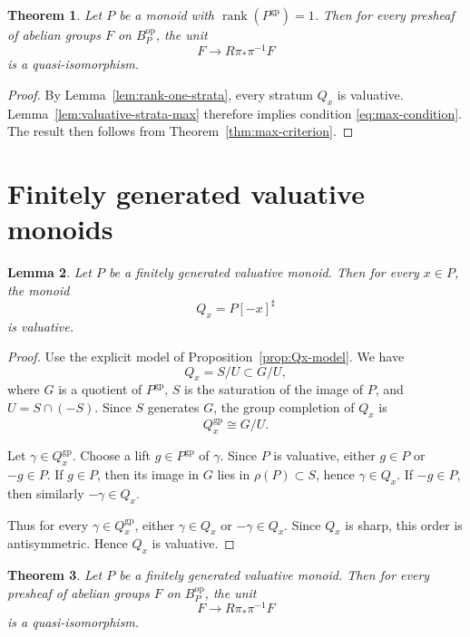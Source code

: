 \documentclass[12pt]{article}
\newtheorem{theorem}{Theorem}[section]
\newtheorem{lemma}[theorem]{Lemma}
\theoremstyle{definition}
\theoremstyle{remark}
\numberwithin{equation}{section}
\newcommand{\gp}{\mathrm{gp}}
\newcommand{\op}{\mathrm{op}}
\begin{document}
\begin{theorem}\label{thm:rank-one-yes}
Let \(P\) be a monoid with \(\operatorname{rank}(P^{\gp})=1\).  Then for every presheaf of abelian groups \(F\) on \(B_P^{\op}\), the unit
\[
F\longrightarrow R\pi_*\pi^{-1}F
\]
is a quasi-isomorphism.
\end{theorem}

\begin{proof}
By Lemma~\ref{lem:rank-one-strata}, every stratum \(Q_x\) is valuative.  Lemma~\ref{lem:valuative-strata-max} therefore implies condition \eqref{eq:max-condition}.  The result then follows from Theorem~\ref{thm:max-criterion}.
\end{proof}

\section{Finitely generated valuative monoids}

\begin{lemma}\label{lem:fg-valuative-strata}
Let \(P\) be a finitely generated valuative monoid.  Then for every \(x\in P\), the monoid
\[
Q_x=P[-x]^\sharp
\]
is valuative.
\end{lemma}

\begin{proof}
Use the explicit model of Proposition~\ref{prop:Qx-model}.  We have
\[
Q_x=S/U\subset G/U,
\]
where \(G\) is a quotient of \(P^{\gp}\), \(S\) is the saturation of the image of \(P\), and \(U=S\cap(-S)\).  Since \(S\) generates \(G\), the group completion of \(Q_x\) is
\[
Q_x^{\gp}\cong G/U.
\]

Let \(\gamma\in Q_x^{\gp}\).  Choose a lift \(g\in P^{\gp}\) of \(\gamma\).  Since \(P\) is valuative, either \(g\in P\) or \(-g\in P\).  If \(g\in P\), then its image in \(G\) lies in \(\rho(P)\subset S\), hence \(\gamma\in Q_x\).  If \(-g\in P\), then similarly \(-\gamma\in Q_x\).

Thus for every \(\gamma\in Q_x^{\gp}\), either \(\gamma\in Q_x\) or \(-\gamma\in Q_x\).  Since \(Q_x\) is sharp, this order is antisymmetric.  Hence \(Q_x\) is valuative.
\end{proof}

\begin{theorem}\label{thm:fg-valuative-yes}
Let \(P\) be a finitely generated valuative monoid.  Then for every presheaf of abelian groups \(F\) on \(B_P^{\op}\), the unit
\[
F\longrightarrow R\pi_*\pi^{-1}F
\]
is a quasi-isomorphism.
\end{theorem}
\end{document}
